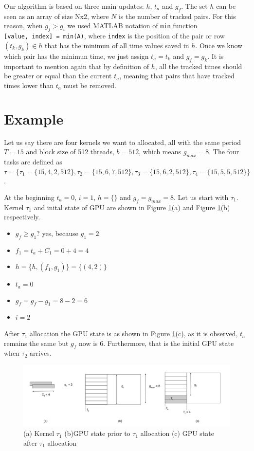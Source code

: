 \documentclass[
  12pt,
  a4paperpaper,
]{report}
\providecommand{\tightlist}{%
  \setlength{\itemsep}{0pt}\setlength{\parskip}{0pt}}
\begin{document}
Our algorithm is based on three main updates: \(h\), \(t_a\) and
\(g_f\). The set \(h\) can be seen as an array of size Nx2, where \(N\)
is the number of tracked pairs. For this reason, when \(g_f > g_i\) we
used MATLAB notation of \texttt{min} function
\texttt{{[}value,\ index{]}\ =\ min(A)}, where \texttt{index} is the
position of the pair or row \((t_k, g_k) \in h\) that has the minimun of
all time values saved in \(h\). Once we know which pair has the minimun
time, we just assign \(t_a = t_k\) and \(g_f = g_k\). It is important to
mention again that by definition of \(h\), all the tracked times should
be greater or equal than the current \(t_a\), meaning that pairs that
have tracked times lower than \(t_a\) must be removed.

\hypertarget{example}{%
\section{Example}\label{example}}

Let us say there are four kernels we want to allocated, all with the same
period \(T = 15\) and block size of 512 threads, \(b = 512\), which
means \(g_{max} = 8\). The four tasks are defined as
\(\tau = \{\tau_1 = \{15, 4, 2, 512\} , \tau_2 = \{15, 6,7,512\}, \tau_3 = \{15, 6,2,512\}, \tau_4 =\{ 15, 5,5,512\} \}\).

At the beginning \(t_a =0\), \(i=1\), \(h=\{\}\) and
\(g_f = g_{max} = 8\). Let us start with \(\tau_1\). Kernel \(\tau_1\)
and inital state of GPU are shown in Figure \ref{img:ex_1}(a) and Figure
\ref{img:ex_1}(b) respectively.

\begin{itemize}
\tightlist
\item
  \(g_f \geq g_1\)? yes, because \(g_1 = 2\)
\item
  \(f_1 = t_a + C_1 = 0 + 4 = 4\)
\item
  \(h = \{h, (f_1, g_1)\} = \{ (4,2) \}\)
\item
  \(t_a = 0\)
\item
  \(g_f = g_f - g_1 = 8 - 2 = 6\)
\item
  \(i = 2\)
\end{itemize}

After \(\tau_1\) allocation the GPU state is as shown in Figure
\ref{img:ex_1}(c), as it is observed, \(t_a\) remains the same but
\(g_f\) now is 6. Furthermore, that is the initial GPU state when
\(\tau_2\) arrives.

\begin{figure}
\centering
\includegraphics{source/figures/ex_1.jpg}
\caption{(a) Kernel \(\tau_1\) (b)GPU state prior to \(\tau_1\)
allocation (c) GPU state after \(\tau_1\) allocation \label{img:ex_1}}
\end{figure}
\end{document}
